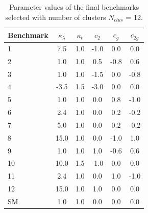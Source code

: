 \begin{table}[htb]
\begin{center}
\begin{tabular}{|l|c|c|c|c|c|}
\hline
Benchmark & $\kappa_{\lambda}$ & $\kappa_{t}$ & $c_2$ & $c_g$ & $c_{2g}$ \\ \hline 
1 & 7.5 & 1.0 & -1.0 & 0.0 & 0.0\\
2 & 1.0 & 1.0 & 0.5 & -0.8 & 0.6 \\
3 & 1.0 & 1.0 & -1.5 & 0.0 & -0.8 \\
4 & -3.5 & 1.5 & -3.0 & 0.0 & 0.0 \\
5 & 1.0 & 1.0 & 0.0 & 0.8 & -1.0 \\
6 & 2.4 & 1.0 & 0.0 & 0.2 & -0.2 \\
7 & 5.0 & 1.0 & 0.0 & 0.2 & -0.2 \\
8 & 15.0 & 1.0 & 0.0 & -1.0 & 1.0 \\
9 & 1.0 & 1.0 & 1.0 & -0.6 & 0.6 \\
10 & 10.0 & 1.5 & -1.0 & 0.0 & 0.0 \\
11 & 2.4 & 1.0 & 0.0 & 1.0 & -1.0 \\
12 & 15.0 & 1.0 & 1.0 & 0.0 & 0.0 \\
SM & 1.0 & 1.0 & 0.0 & 0.0 & 0.0 \\
\hline
\end{tabular}
\end{center}
\caption{Parameter values of the final benchmarks selected with number of clusters $N_{clus}$ = 12.}
\label{tab:benchmarks}
\end{table}
